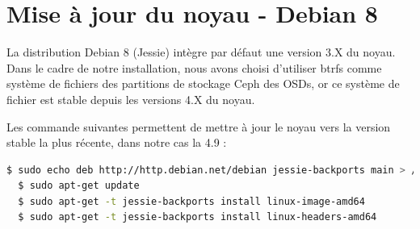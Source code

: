 \chapter{Mise à jour du noyau  - Debian 8}\label{annexe_noyau_install}

La distribution Debian 8 (Jessie) intègre par défaut une version 3.X du noyau. Dans le cadre de notre installation, nous avons choisi d'utiliser btrfs comme système de fichiers des partitions de stockage Ceph des OSDs, or ce système de fichier est stable depuis les versions 4.X du noyau.

Les commande suivantes permettent de mettre à jour le noyau vers la version stable la plus récente, dans notre cas la 4.9 :
\vspace{3mm}
\begin{lstlisting}[language=bash] 
  $ sudo echo deb http://http.debian.net/debian jessie-backports main > /etc/apt/sources.list.d/jessie-backports.list
  $ sudo apt-get update
  $ sudo apt-get -t jessie-backports install linux-image-amd64
  $ sudo apt-get -t jessie-backports install linux-headers-amd64
\end{lstlisting}
